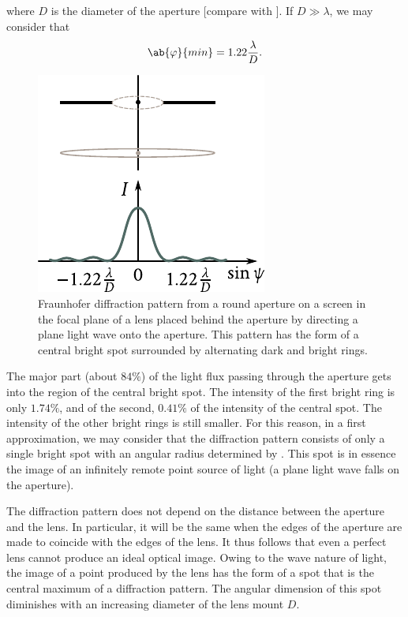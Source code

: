 \noindent
where $D$ is the diameter of the aperture [compare with ].
If $D\gg\lambda$, we may consider that
\begin{equation}\label{eq:18_66}
	\ab{\varphi}{min} = 1.22 \frac{\lambda}{D}.
\end{equation}

\begin{figure}[!htb]
	\begin{center}
		\includegraphics[scale=1.0]{figures/ch_18/fig_18_47.pdf}
        \caption[]{Fraunhofer diffraction pattern from a round aperture on a screen in the focal plane of a lens placed behind the aperture by directing a plane light wave onto the aperture. This pattern has the form of a central bright spot surrounded by alternating dark and bright rings.}
		\label{fig:18_47}
	\end{center}
	\vspace{-0.8cm}
\end{figure}

The major part (about $84\%$) of the light flux passing through the aperture gets into the region of the central bright spot.
The intensity of the first bright ring is only
$1.74\%$, and of the second, $0.41\%$ of the intensity of the central spot.
The intensity of the other bright rings is still
smaller.
For this reason, in a first approximation, we may consider that the diffraction pattern consists of only a single bright spot with an angular radius determined by .
This spot is in essence the image of an infinitely remote point source of light (a plane light wave falls on the aperture).

The diffraction pattern does not depend on the distance between the aperture and the lens.
In particular, it will be the same when the edges of the aperture are made to coincide with the edges of the lens.
It thus follows that even a perfect lens cannot produce an ideal optical image.
Owing to the wave nature of light, the image of a point produced by the lens has the form of a spot that is the central maximum of a diffraction pattern.
The angular dimension of this spot diminishes with an increasing diameter of the lens mount $D$.

